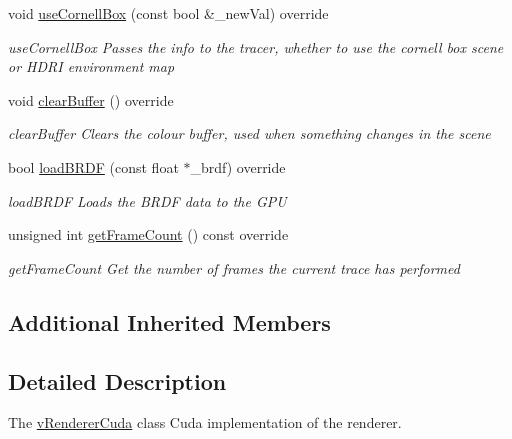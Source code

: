 \begin{DoxyCompactItemize}
void \hyperlink{classvRendererCuda_a40978e8a1b32dbad5b683b0f097d9c60}{use\-Cornell\-Box} (const bool \&\-\_\-new\-Val) override
\begin{DoxyCompactList}\small\item\em use\-Cornell\-Box Passes the info to the tracer, whether to use the cornell box scene or H\-D\-R\-I environment map \end{DoxyCompactList}\item 
\hypertarget{classvRendererCuda_a1fd902cd1f41af0baca67bb50b88226c}{void \hyperlink{classvRendererCuda_a1fd902cd1f41af0baca67bb50b88226c}{clear\-Buffer} () override}\label{classvRendererCuda_a1fd902cd1f41af0baca67bb50b88226c}

\begin{DoxyCompactList}\small\item\em clear\-Buffer Clears the colour buffer, used when something changes in the scene \end{DoxyCompactList}\item 
bool \hyperlink{classvRendererCuda_a77eb1673efa671d9a21353fe22f576d7}{load\-B\-R\-D\-F} (const float $\ast$\-\_\-brdf) override
\begin{DoxyCompactList}\small\item\em load\-B\-R\-D\-F Loads the B\-R\-D\-F data to the G\-P\-U \end{DoxyCompactList}\item 
unsigned int \hyperlink{classvRendererCuda_a59adae8a97ef2a63fc542f64d4686f37}{get\-Frame\-Count} () const override
\begin{DoxyCompactList}\small\item\em get\-Frame\-Count Get the number of frames the current trace has performed \end{DoxyCompactList}\end{DoxyCompactItemize}
\subsection*{Additional Inherited Members}


\subsection{Detailed Description}
The \hyperlink{classvRendererCuda}{v\-Renderer\-Cuda} class Cuda implementation of the renderer. 

